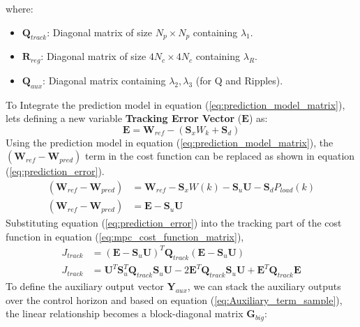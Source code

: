 where:
\begin{itemize}
    \item $\mathbf{Q}_{track}$: Diagonal matrix of size $N_p \times N_p$ containing $\lambda_1$.
    \item $\mathbf{R}_{reg}$: Diagonal matrix of size $4N_c \times 4N_c$ containing $\lambda_R$.
    \item $\mathbf{Q}_{aux}$: Diagonal matrix containing $\lambda_2, \lambda_3$ (for Q and Ripples).
\end{itemize}
To Integrate the prediction model in equation (\ref{eq:prediction_model_matrix}),
lets defining a new variable \textbf{Tracking Error Vector} ($\mathbf{E}$) as:
\begin{equation}
    \mathbf{E} = \mathbf{W}_{ref} - (\mathbf{S}_x W_k + \mathbf{S}_d)
    \label{eq:tracking_error_vector}
\end{equation}
Using the prediction model in equation (\ref{eq:prediction_model_matrix}), the $(\mathbf{W}_{ref} - \mathbf{W}_{pred})$
term in the cost function can be replaced as shown in equation (\ref{eq:prediction_error}).
\begin{equation}
    \begin{split}
        (\mathbf{W}_{ref} - \mathbf{W}_{pred}) &= \mathbf{W}_{ref} - \mathbf{S}_x W(k) - \mathbf{S}_u \mathbf{U} - \mathbf{S}_d P_{load}(k) \\
        (\mathbf{W}_{ref} - \mathbf{W}_{pred}) &= \mathbf{E} - \mathbf{S}_u \mathbf{U}
    \end{split}
    \label{eq:prediction_error}
\end{equation}
Substituting equation (\ref{eq:prediction_error}) into the tracking part of the cost function in equation (\ref{eq:mpc_cost_function_matrix}),
\begin{equation}
    \begin{split}
        J_{track} &= (\mathbf{E} - \mathbf{S}_u \mathbf{U})^T \mathbf{Q}_{track} (\mathbf{E} - \mathbf{S}_u \mathbf{U}) \\
        J_{track} &= \mathbf{U}^T \mathbf{S}_u^T \mathbf{Q}_{track} \mathbf{S}_u \mathbf{U} - 2 \mathbf{E}^T \mathbf{Q}_{track} \mathbf{S}_u \mathbf{U} + \mathbf{E}^T \mathbf{Q}_{track} \mathbf{E}
    \end{split}
    \label{eq:tracking_cost_expanded}
\end{equation}
To define the auxiliary output vector $\mathbf{Y}_{aux}$, we can stack the auxiliary outputs over the control horizon and based on equation
(\ref{eq:Auxiliary_term_sample}), the linear relationship becomes a block-diagonal matrix $\mathbf{G}_{big}$:
